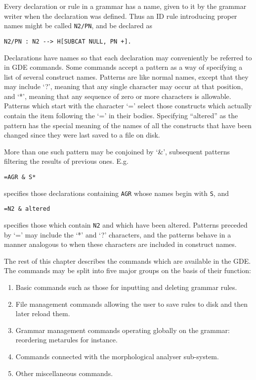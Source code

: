 Every declaration or rule in a grammar has a name, given to it by
the grammar writer when the declaration was defined. Thus an ID rule
introducing proper names might be called {\tt N2/PN}, and be declared as
\begin{ex}
\begin{verbatim}
N2/PN : N2 --> H[SUBCAT NULL, PN +].
\end{verbatim}
\end{ex}
Declarations have names so that each declaration may conveniently be
referred to in GDE commands.  Some commands accept a pattern as a way of
specifying a list of several construct names. Patterns are like normal
names, except that they may include `?', meaning that any single character
may occur at that position, and `*', meaning that any sequence of zero
or more characters is allowable.  Patterns which start with the
character `=' select those constructs which actually contain the item
following the `=' in their bodies. Specifying ``altered'' as the pattern
has the special meaning of the names of all the constructs that have
been changed since they were last saved to a file on disk. 

More than one such pattern may be conjoined by `\&', subsequent patterns
filtering the results of previous ones. E.g.
\begin{ex}
\begin{verbatim}
=AGR & S*
\end{verbatim}
\end{ex}
specifies those declarations containing {\tt AGR} whose names begin
with {\tt S}, and
\begin{ex}
\begin{verbatim}
=N2 & altered
\end{verbatim}
\end{ex}
specifies those which contain {\tt N2} and which have been altered.
Patterns preceded by `=' may include the `*' and `?' characters,
and the patterns behave in a manner analogous to when these characters
are included in construct names.

The rest of this chapter describes the commands which are available in the
GDE. The commands may be split into five major groups on the basis of their
function: 

\begin{enumerate}
\item Basic commands such as those for inputting and deleting grammar rules. 

\item File management commands allowing the user to save rules to disk and then
later reload them. 

\item Grammar management commands operating globally on the grammar: reordering
metarules for instance.

\item Commands connected with the morphological analyser sub-system.

\item Other miscellaneous commands.
\end{enumerate}

